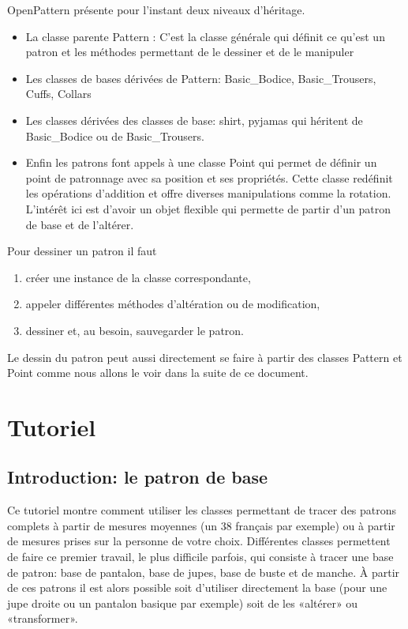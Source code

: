 \documentclass[10pt,a4paper,twoside]{report}
\begin{document}
OpenPattern présente pour l'instant deux niveaux d'héritage.
\begin{itemize}
\item La classe parente Pattern : C'est la classe générale qui définit ce qu'est un patron et les méthodes permettant de le dessiner et de le manipuler
\item Les classes de bases dérivées de Pattern: Basic\_Bodice, Basic\_Trousers, Cuffs, Collars
\item Les classes dérivées des classes de base: shirt, pyjamas qui héritent de Basic\_Bodice ou de Basic\_Trousers. \item Enfin les patrons font appels à une classe Point qui permet de définir un point de patronnage avec sa position et ses propriétés. Cette classe redéfinit les opérations d'addition et offre diverses manipulations  comme la rotation. L'intérêt ici est d'avoir un objet flexible qui permette de partir d'un patron de base et de l'altérer.
\end{itemize}

Pour dessiner un patron il faut
\begin{enumerate}
\item créer une instance de la classe correspondante,
\item appeler différentes méthodes d'altération ou de modification,
\item dessiner et, au besoin, sauvegarder le patron.
\end{enumerate}

Le dessin du patron peut aussi  directement se faire à partir des classes Pattern et Point comme nous allons le voir dans la suite de ce document.

\chapter{Tutoriel}



\section{Introduction: le patron de base}

Ce tutoriel montre comment utiliser les classes permettant de tracer des patrons complets à partir de mesures moyennes (un 38 français par exemple) ou à partir de mesures prises sur la personne de votre choix.
Différentes classes permettent de faire ce premier travail, le plus difficile parfois, qui consiste à tracer une base de patron:  base de pantalon, base de jupes, base de buste et de manche. À partir de ces patrons  il est alors  possible soit d'utiliser directement la base (pour une jupe droite ou un pantalon basique par exemple) soit de les «altérer» ou «transformer».
\end{document}
